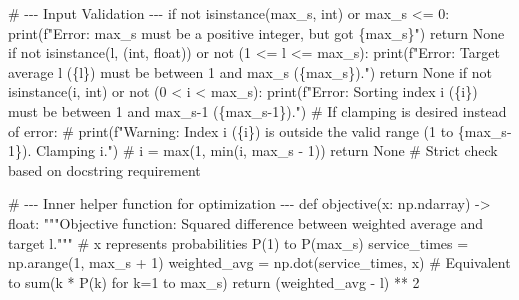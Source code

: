 \documentclass[
  letterpaper,
  DIV=11,
  numbers=noendperiod]{scrartcl}
\newenvironment{Shaded}{\begin{snugshade}}{\end{snugshade}}
\newcommand{\BuiltInTok}[1]{\textcolor[rgb]{0.00,0.23,0.31}{#1}}
\newcommand{\CommentTok}[1]{\textcolor[rgb]{0.37,0.37,0.37}{#1}}
\newcommand{\ControlFlowTok}[1]{\textcolor[rgb]{0.00,0.23,0.31}{#1}}
\newcommand{\DecValTok}[1]{\textcolor[rgb]{0.68,0.00,0.00}{#1}}
\newcommand{\KeywordTok}[1]{\textcolor[rgb]{0.00,0.23,0.31}{#1}}
\newcommand{\NormalTok}[1]{\textcolor[rgb]{0.00,0.23,0.31}{#1}}
\newcommand{\OperatorTok}[1]{\textcolor[rgb]{0.37,0.37,0.37}{#1}}
\newcommand{\SpecialCharTok}[1]{\textcolor[rgb]{0.37,0.37,0.37}{#1}}
\newcommand{\SpecialStringTok}[1]{\textcolor[rgb]{0.13,0.47,0.30}{#1}}
\newcommand{\VariableTok}[1]{\textcolor[rgb]{0.07,0.07,0.07}{#1}}
\begin{document}
\begin{Shaded}
\begin{Highlighting}[]
    \CommentTok{\# {-}{-}{-} Input Validation {-}{-}{-}}
    \ControlFlowTok{if} \KeywordTok{not} \BuiltInTok{isinstance}\NormalTok{(max\_s, }\BuiltInTok{int}\NormalTok{) }\KeywordTok{or}\NormalTok{ max\_s }\OperatorTok{\textless{}=} \DecValTok{0}\NormalTok{:}
        \BuiltInTok{print}\NormalTok{(}\SpecialStringTok{f"Error: max\_s must be a positive integer, but got }\SpecialCharTok{\{}\NormalTok{max\_s}\SpecialCharTok{\}}\SpecialStringTok{"}\NormalTok{)}
        \ControlFlowTok{return} \VariableTok{None}
    \ControlFlowTok{if} \KeywordTok{not} \BuiltInTok{isinstance}\NormalTok{(l, (}\BuiltInTok{int}\NormalTok{, }\BuiltInTok{float}\NormalTok{)) }\KeywordTok{or} \KeywordTok{not}\NormalTok{ (}\DecValTok{1} \OperatorTok{\textless{}=}\NormalTok{ l }\OperatorTok{\textless{}=}\NormalTok{ max\_s):}
        \BuiltInTok{print}\NormalTok{(}\SpecialStringTok{f"Error: Target average \textquotesingle{}l\textquotesingle{} (}\SpecialCharTok{\{}\NormalTok{l}\SpecialCharTok{\}}\SpecialStringTok{) must be between 1 and max\_s (}\SpecialCharTok{\{}\NormalTok{max\_s}\SpecialCharTok{\}}\SpecialStringTok{)."}\NormalTok{)}
        \ControlFlowTok{return} \VariableTok{None}
    \ControlFlowTok{if} \KeywordTok{not} \BuiltInTok{isinstance}\NormalTok{(i, }\BuiltInTok{int}\NormalTok{) }\KeywordTok{or} \KeywordTok{not}\NormalTok{ (}\DecValTok{0} \OperatorTok{\textless{}}\NormalTok{ i }\OperatorTok{\textless{}}\NormalTok{ max\_s):}
        \BuiltInTok{print}\NormalTok{(}\SpecialStringTok{f"Error: Sorting index \textquotesingle{}i\textquotesingle{} (}\SpecialCharTok{\{}\NormalTok{i}\SpecialCharTok{\}}\SpecialStringTok{) must be between 1 and max\_s{-}1 (}\SpecialCharTok{\{}\NormalTok{max\_s}\OperatorTok{{-}}\DecValTok{1}\SpecialCharTok{\}}\SpecialStringTok{)."}\NormalTok{)}
        \CommentTok{\# If clamping is desired instead of error:}
        \CommentTok{\# print(f"Warning: Index \textquotesingle{}i\textquotesingle{} (\{i\}) is outside the valid range (1 to \{max\_s{-}1\}). Clamping i.")}
        \CommentTok{\# i = max(1, min(i, max\_s {-} 1))}
        \ControlFlowTok{return} \VariableTok{None} \CommentTok{\# Strict check based on docstring requirement}

    \CommentTok{\# {-}{-}{-} Inner helper function for optimization {-}{-}{-}}
    \KeywordTok{def}\NormalTok{ objective(x: np.ndarray) }\OperatorTok{{-}\textgreater{}} \BuiltInTok{float}\NormalTok{:}
        \CommentTok{"""Objective function: Squared difference between weighted average and target l."""}
        \CommentTok{\# x represents probabilities P(1) to P(max\_s)}
\NormalTok{        service\_times }\OperatorTok{=}\NormalTok{ np.arange(}\DecValTok{1}\NormalTok{, max\_s }\OperatorTok{+} \DecValTok{1}\NormalTok{)}
\NormalTok{        weighted\_avg }\OperatorTok{=}\NormalTok{ np.dot(service\_times, x) }\CommentTok{\# Equivalent to sum(k * P(k) for k=1 to max\_s)}
        \ControlFlowTok{return}\NormalTok{ (weighted\_avg }\OperatorTok{{-}}\NormalTok{ l) }\OperatorTok{**} \DecValTok{2}


\end{Highlighting}
\end{Shaded}
\end{document}
